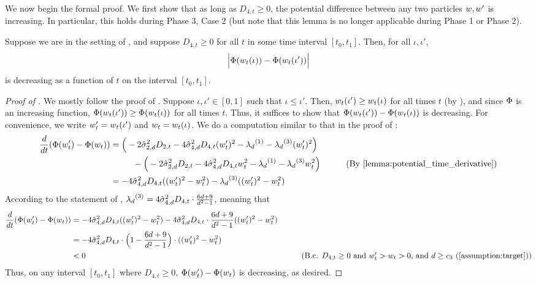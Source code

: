 We now begin the formal proof. We first show that as long as $D_{4, t} \geq 0$, the potential difference between any two particles $w, w'$ is increasing. In particular, this holds during Phase 3, Case 2 (but note that this lemma is no longer applicable during Phase 1 or Phase 2).

\begin{lemma}  \label{lemma:case_2_potential_decrease}
Suppose we are in the setting of , and suppose $D_{4, t} \geq 0$ for all $t$ in some time interval $[t_0, t_1]$. Then, for all $\iota, \iota'$,
\begin{align}
\Big|\Phi(w_t(\iota)) - \Phi(w_t(\iota'))\Big|
\end{align}
is decreasing as a function of $t$ on the interval $[t_0, t_1]$.
\end{lemma}
\begin{proof}[Proof of ]
We mostly follow the proof of . Suppose $\iota, \iota' \in [0, 1]$ such that $\iota \leq \iota'$. Then, $w_t(\iota') \geq w_t(\iota)$ for all times $t$ (by ), and since $\Phi$ is an increasing function, $\Phi(w_t(\iota')) \geq \Phi(w_t(\iota))$ for all times $t$. Thus, it suffices to show that $\Phi(w_t(\iota')) - \Phi(w_t(\iota))$ is decreasing. For convenience, we write $w_t' = w_t(\iota')$ and $w_t = w_t(\iota)$. We do a computation similar to that in the proof of :
\begin{align}
\frac{d}{dt} (\potential(\w_t') - \potential(\w_t))
& = \Big(-2 \sigmaCoeffTwo^2 D_{2, t} - 4 \sigmaCoeffFour^2 D_{4, t} (\w_t')^2 - \lambdaD^{(1)} - \lambdaD^{(3)} (\w_t')^2\Big) \\
& \nextlinespace - \Big(-2 \sigmaCoeffTwo^2 D_{2, t} - 4 \sigmaCoeffFour^2 D_{4, t} \w_t^2 - \lambdaD^{(1)} - \lambdaD^{(3)} \w_t^2 \Big) 
& \tag{By \Cref{lemma:potential_time_derivative}} \\
& = -4\sigmaCoeffFour^2 D_{4, t} ((\w_t')^2 - \w_t^2) - \lambdaD^{(3)} ((\w_t')^2 - \w_t^2)
\end{align}
According to the statement of , ${\lambda_d}^{(3)} = 4 \hat{\sigma}_{4, d}^2 D_{4, t} \cdot \frac{6d + 9}{d^2 - 1}$, meaning that
\begin{align}
\frac{d}{dt} (\potential(\w_t') - \potential(\w_t)) 
& = -4 \sigmaCoeffFour^2 D_{4, t} ((\w_t')^2 - \w_t^2) - 4 \sigmaCoeffFour^2 D_{4, t} \cdot \frac{6d + 9}{d^2 - 1} ((\w_t')^2 - \w_t^2) \\
& = -4 \sigmaCoeffFour^2 D_{4, t} \cdot \Big(1 - \frac{6d + 9}{d^2 - 1}\Big) \cdot ((\w_t')^2 - \w_t^2) \\
& < 0
& \tag{B.c. $D_{4, t} \geq 0$ and $\w_t' > \w_t > 0$, and $d \geq c_3$ (\Cref{assumption:target})}
\end{align}
Thus, on any interval $[t_0, t_1]$ where $D_{4, t} \geq 0$, $\Phi(w_t') - \Phi(w_t)$ is decreasing, as desired.
\end{proof}


